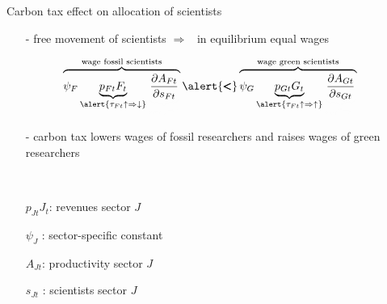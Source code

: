 \documentclass[11pt,aspectratio=169]{beamer}
\newcommand{\ar}{$\Rightarrow$ \ }
\begin{document}
\addtocounter{framenumber}{-1}

\begin{frame}{Carbon tax effect on \alert{allocation of scientists}}
	\begin{itemize}
		\item[-] free movement of scientists \ar in equilibrium equal wages
	\end{itemize}
	\vspace{0mm}
	\large
	\begin{align*}
		\color{black}
		\overbrace{{\psi_F} \underbrace{p_{Ft}{F_t}}_{{\alert{\tau_{Ft}\uparrow\Rightarrow\downarrow}}}\textcolor{black!1}{\underbrace{\textcolor{black}{\frac{\partial A_{Ft}}{\partial s_{Ft}}}}_{{{s_{Ft}\downarrow\Rightarrow\uparrow}}}}}^{\text{wage fossil scientists}}\alert{\pmb{<}}\overbrace{{\psi_G} \underbrace{p_{Gt}{G_t}}_{{\alert{\tau_{Ft}\uparrow\Rightarrow\uparrow}}}\textcolor{black!1}{\underbrace{\textcolor{black}{\frac{\partial A_{Gt}}{\partial s_{Gt}}}}_{	{{s_{Gt}\uparrow\Rightarrow\downarrow}}}}}^{\text{wage green scientists}}
	\end{align*}
	\normalsize
	\vspace{-2mm}
	\begin{itemize}
		\item[-] carbon tax lowers wages of fossil researchers and raises wages of green researchers
		\vspace{1mm}
		\item[] \  %
	\end{itemize}
	\small
	\vspace{4mm}
	\hspace{-2mm}
	\begin{minipage}[t!]{0.4\textwidth}
		\vspace{0mm}
		\begin{itemize}
			\item[] $p_{Jt}J_t$: revenues sector $J$
			\vspace{-2mm}
			\item[] $\psi_J$ : sector-specific constant
		\end{itemize}
	\end{minipage}
	\vspace{-5mm}
	\begin{minipage}[t!]{0.5\textwidth}
		\vspace{0mm}
		\begin{itemize}	
			\item[] $A_{Jt}$: productivity sector $J$
			\vspace{-2mm}			
			\item[] $s_{Jt}$ : scientists sector $J$
		\end{itemize}
	\end{minipage}
	

\end{frame}
\end{document}
